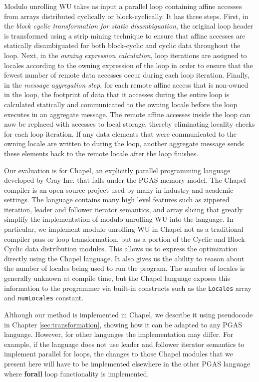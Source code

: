 Modulo unrolling WU takes as input a parallel loop containing affine accesses from arrays distributed cyclically or block-cyclically. It has three steps. First, in the \textit{block cyclic transformation for static disambiguation}, the original loop header is transformed using a strip mining technique to ensure that affine accesses are statically disambiguated for both block-cyclic and cyclic data throughout the loop. Next, in the \textit{owning expression calculation}, loop iterations are assigned to locales according to the owning expression of the loop in order to ensure that the fewest number of remote data accesses occur during each loop iteration. Finally, in the \textit{message aggregation step}, for each remote affine access that is non-owned in the loop, the footprint of data that it accesses during the entire loop is calculated statically and communicated to the owning locale before the loop executes in an aggregate message. The remote affine accesses inside the loop can now be replaced with accesses to local storage, thereby eliminating locality checks for each loop iteration. If any data elements that were communicated to the owning locale are written to during the loop, another aggregate message sends these elements back to the remote locale after the loop finishes. 

Our evaluation is for Chapel, an explicitly parallel programming language developed by Cray Inc. that falls under the PGAS memory model. The Chapel compiler is an open source project used by many in industry and academic settings. The language contains many high level features such as zippered iteration, leader and follower iterator semantics, and array slicing that greatly simplify the implementation of modulo unrolling WU into the language. In particular, we implement modulo unrolling WU in Chapel not as a traditional compiler pass or loop transformation, but as a portion of the Cyclic and Block Cyclic data distribution modules. This allows us to express the optimization directly using the Chapel language. It also gives us the ability to reason about the number of locales being used to run the program. The number of locales is generally unknown at compile time, but the Chapel language exposes this information to the programmer via built-in constructs such as the \texttt{Locales} array and \texttt{numLocales} constant. 

Although our method is implemented in Chapel, we describe it using pseudocode in Chapter \ref{sec:transformation}, showing how it can be adapted to any PGAS language. However, for other languages the implementation may differ. For example, if the language does not use leader and follower iterator semantics to implement parallel for loops, the changes to those Chapel modules that we present here will have to be implemented elsewhere in the other PGAS language where \textbf{forall} loop functionality is implemented.

